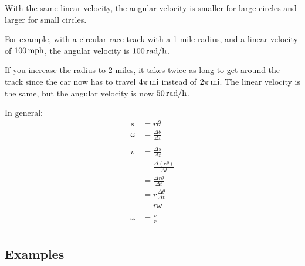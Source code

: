\documentclass{exam}
\begin{document}
  With the same linear velocity, the angular velocity is smaller for large circles and larger for small circles.

  For example, with a circular race track with a 1 mile radius, and a linear velocity of $\unit[100]{mph}$, the
  angular velocity is $\unit[100]{rad/h}$.  
  
  If you increase the radius to 2 miles, it takes twice as long to get around the track since the car now has to
  travel $\unit[4 \pi]{mi}$ instead of $\unit[2 \pi]{mi}$.  The linear velocity is the same, but the angular velocity is 
  now $\unit[50]{rad/h}$.

  In general:
  \begin{align*}
    s      & = r \theta \\
    \omega & = \frac{\Delta \theta}{\Delta t} \\
    \\
    v & = \frac{\Delta s}{\Delta t} \\
      & = \frac{\Delta (r \theta)}{\Delta t} \\
      & = \frac{\Delta r \theta}{\Delta t} \\
      & = r \frac{\Delta \theta}{\Delta t} \\
      & = r \omega \\
    \\
    \omega &= \frac{v}{r} \\
  \end{align*}

  \subsection{Examples}
\end{document}
